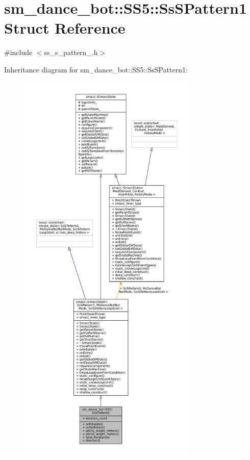 \hypertarget{structsm__dance__bot_1_1SS5_1_1SsSPattern1}{}\section{sm\+\_\+dance\+\_\+bot\+:\+:S\+S5\+:\+:Ss\+S\+Pattern1 Struct Reference}
\label{structsm__dance__bot_1_1SS5_1_1SsSPattern1}


{\ttfamily \#include $<$ss\+\_\+s\+\_\+pattern\+\_.\+h$>$}



Inheritance diagram for sm\+\_\+dance\+\_\+bot\+:\+:S\+S5\+:\+:Ss\+S\+Pattern1\+:
\nopagebreak
\begin{figure}[H]
\begin{center}
\leavevmode
\includegraphics[height=550pt]{structsm__dance__bot_1_1SS5_1_1SsSPattern1__inherit__graph}
\end{center}
\end{figure}


